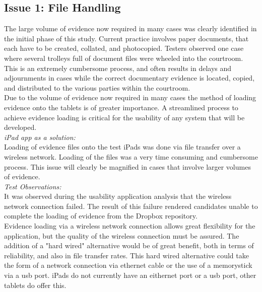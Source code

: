 \documentclass{article}
\begin{document}
\subsection{Issue 1: File Handling}
The large volume of evidence now required in many cases was clearly identified in the initial phase of this study. Current practice involves paper documents, that each have to be created, collated, and photocopied. Testers observed one case where several trolleys full of document files were wheeled into the courtroom. This is an extremely cumbersome process, and often results in delays and adjournments in cases while the correct documentary evidence is located, copied, and distributed to the various parties within the courtroom.\\
Due to the volume of evidence now required in many cases the method of loading evidence onto the tablets is of greater importance. A streamlined process to achieve evidence loading is critical for the usability of any system that will be developed.\\
\textit{iPad app as a solution:}\\
Loading of evidence files onto the test iPads was done via file transfer over a wireless network. Loading of the files was a very time consuming and cumbersome process. This issue will clearly be magnified in cases that involve larger volumes of evidence.\\
\textit{Test Observations:}\\
It was observed during the usability application analysis that the wireless network connection failed. The result of this failure rendered candidates unable to complete the loading of evidence from the Dropbox repository.\\
Evidence loading via a wireless network connection allows great flexibility for the application, but the quality of the wireless connection must be assured. The addition of a "hard wired" alternative would be of great benefit, both in terms of reliability, and also in file transfer rates. This hard wired alternative could take the form of a network connection via ethernet cable or the use of a memorystick via a usb port. iPads do not currently have an eithernet port or a usb port, other tablets do offer this.\\
\end{document}

